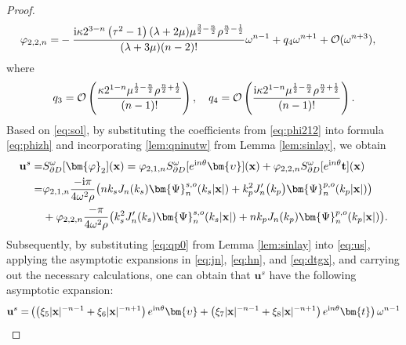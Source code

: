 \documentclass[11pt,reqno,twoside]{amsart}
\theoremstyle{definition}
\theoremstyle{remark}
\numberwithin{equation}{section}
\newcommand{\bu}{\mathbf{u}}
\newcommand{\bx}{\mathbf{x}}
\begin{document}
\begin{proof}
\begin{align}
		\varphi _{2,2,n}=&-\frac{\mathrm{i} \kappa 2^{3-n} \left(\tau ^2-1\right) (\lambda +2 \mu ) \mu ^{\frac{3}{2}-\frac{n}{2}} \rho ^{\frac{n}{2}-\frac{1}{2}}}{(\lambda +3 \mu ) (n-2)!}\omega ^{n-1}+q_{4}\omega ^{n+1}+ \mathcal{O}(\omega^{n+3}), \notag
	\end{align}
	where
	\begin{align}
		q_{3}=\mathcal{O}\left(\frac{\kappa 2^{1-n}  \mu ^{\frac{1}{2}-\frac{n}{2}} \rho ^{\frac{n}{2}+\frac{1}{2}}}{(n-1)!}\right),\quad q_{4}=\mathcal{O}\left(\frac{\mathrm{i} \kappa 2^{1-n}  \mu ^{\frac{1}{2}-\frac{n}{2}} \rho ^{\frac{n}{2}+\frac{1}{2}}}{(n-1)!}\right).\notag
	\end{align}
	Based on \eqref{eq:sol}, by substituting the coefficients from \eqref{eq:phi212} into formula \eqref{eq:phizh} and incorporating  \eqref{lem:qninutw} from Lemma \ref{lem:sinlay}, we obtain 
	\begin{align}
		\bu^s =&S_{\partial D }^{\omega }[\bm{\varphi} _{2} ] (\bx) 
		=\varphi _{2,1,n}S_{\partial D }^{\omega }[e^{\mathrm{i}n\theta }\bm{\upsilon}] (\bx)+\varphi _{2,2,n}S_{\partial D }^{\omega }[e^{\mathrm{i}n\theta }\mathbf{t}] (\bx) \label{eq:us}\\
		=&\varphi _{2,1,n} \frac{-\mathrm{i}\pi}{4\omega^{2}\rho }\big(nk_{s}J_{n}(k_{s})\bm{\Psi}_{n}^{s,o}(k_{s}|\mathbf{x}|)+k_{p}^{2}J_{n}^{\prime}\big(k_{p}\big)\bm{\Psi}_{n}^{p,o}(k_{p}|\mathbf{x}|)\big) \notag\\
		&+\varphi _{2,2,n} \frac{-\pi}{4\omega^{2}\rho }\big(k_{s}^{2}J_{n}^{\prime}(k_{s})\bm{\Psi}_{n}^{s,o}(k_{s}|\mathbf{x}|)+nk_{p}J_{n}(k_{p})\bm{\Psi}_{n}^{p,o}(k_{p}|\mathbf{x}|)\big).\notag
	\end{align}
	Subsequently, by substituting \eqref{eq:qp0} from Lemma \ref{lem:sinlay} into \eqref{eq:us}, applying the asymptotic expansions in \eqref{eq:jn}, \eqref{eq:hn}, and \eqref{eq:dtgx}, and carrying out the necessary calculations, one can obtain that $\bu^s$ have the following asymptotic expansion: 
	\begin{align}
		\bu^{s}
		=&\left(\left(\xi _5|\bx|^{-n-1}+\xi_6|\bx|^{-n+1}\right)e^{\mathrm{i}n\theta }\bm{\upsilon}+\left(\xi _7|\bx|^{-n-1}+\xi_8|\bx|^{-n+1}\right)e^{\mathrm{i}n\theta }\bm{t}\right)\omega ^{n-1}\notag\\

\end{align}
\end{proof}
\end{document}
